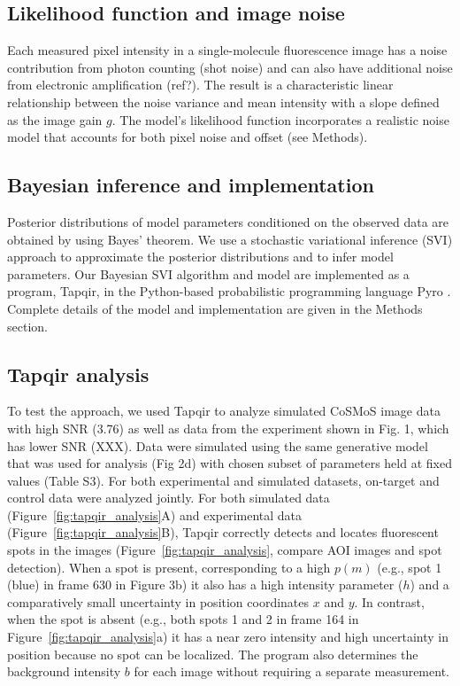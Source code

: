 \subsection*{Likelihood function and image noise}

Each measured pixel intensity in a single-molecule fluorescence image has a noise contribution from photon counting (shot noise) and can also have additional noise from electronic amplification (ref?). The result is  a characteristic linear relationship between the noise variance and  mean intensity with a slope defined as the image gain $g$. The model's likelihood function incorporates a realistic noise model that accounts for both pixel noise and offset (see Methods). 

\subsection*{Bayesian inference and implementation}

Posterior distributions of model parameters conditioned on the observed data are obtained by using Bayes' theorem. We use a stochastic variational inference (SVI) approach to approximate the posterior distributions and to infer model parameters. Our Bayesian SVI algorithm and model are implemented as a program, Tapqir, in the Python-based probabilistic programming language Pyro \cite{Bingham2019-qy}. Complete details of the model and implementation are given in the Methods section.

\subsection*{Tapqir analysis} %

To test the approach, we used Tapqir to analyze simulated CoSMoS image data with high SNR (3.76) as well as data from the experiment shown in Fig. 1, which has lower SNR (XXX). Data were simulated using the same generative model that was used for analysis (Fig 2d) with chosen subset of parameters held at fixed values (Table S3). For both experimental and simulated datasets, on-target and control data were analyzed jointly. For both simulated data (Figure~\ref{fig:tapqir_analysis}A) and experimental data (Figure~\ref{fig:tapqir_analysis}B), Tapqir correctly detects and locates fluorescent spots in the images (Figure~\ref{fig:tapqir_analysis}, compare AOI images and spot detection). When a spot is present, corresponding to a high $p(m)$ (e.g., spot 1 (blue) in frame 630 in Figure 3b) it also has a high intensity parameter ($h$) and a comparatively small uncertainty in position coordinates $x$ and $y$. In contrast, when the spot is absent (e.g., both spots 1 and 2 in frame 164 in Figure~\ref{fig:tapqir_analysis}a) it has a near zero intensity and high uncertainty in position because no spot can be localized. The program also determines the background intensity $b$ for each image without requiring a separate measurement. 

